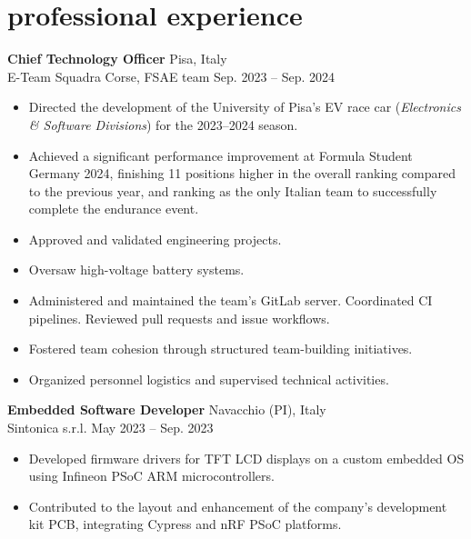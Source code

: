 \documentclass[11pt]{article}
\newcommand{\entry}[4]{{{\textbf{#1}}} \hfill #3 \\ #2 \hfill #4}
\begin{document}
	\section{professional experience}
	
	\entry{Chief Technology Officer}{E-Team Squadra Corse, FSAE team}{Pisa, Italy}{Sep. 2023 -- Sep. 2024}
	\begin{itemize}[noitemsep,leftmargin=10.0mm,rightmargin=0mm,topsep=6pt]
		\item Directed the development of the University of Pisa's EV race car (\textit{Electronics \& Software Divisions}) for the 2023--2024 season.
		\item Achieved a significant performance improvement at Formula Student Germany 2024, finishing 11 positions higher in the overall ranking compared to the previous year, and ranking as the only Italian team to successfully complete the endurance event.
		\item Approved and validated engineering projects.
		\item Oversaw high-voltage battery systems.
		\item Administered and maintained the team's GitLab server. Coordinated CI pipelines. Reviewed pull requests and issue workflows.
		\item Fostered team cohesion through structured team-building initiatives.
		\item Organized personnel logistics and supervised technical activities.
	\end{itemize}
	
	
	\entry{Embedded Software Developer}{Sintonica s.r.l.}{Navacchio (PI), Italy}{May 2023 -- Sep. 2023}
	\begin{itemize}[noitemsep,leftmargin=10.0mm,leftmargin=10.0mm,rightmargin=0mm,topsep=6pt]
		\item Developed firmware drivers for TFT LCD displays on a custom embedded OS using Infineon PSoC ARM microcontrollers.
		\item Contributed to the layout and enhancement of the company’s development kit PCB, integrating Cypress and nRF PSoC platforms.
	\end{itemize}
	
	
\end{document}
